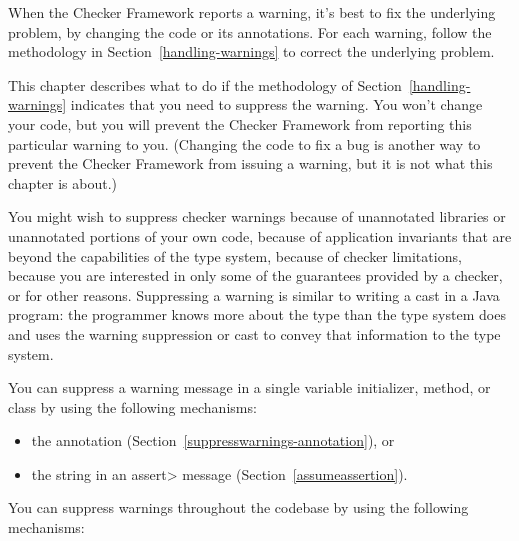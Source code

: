 

When the Checker Framework reports a warning, it's best to fix the
underlying problem, by changing the code or its annotations.  For each
warning, follow the methodology in Section~\ref{handling-warnings} to
correct the underlying problem.

This chapter describes what to do if the methodology of
Section~\ref{handling-warnings} indicates that you need to suppress the
warning.  You won't change your code, but you will prevent the Checker
Framework from reporting this particular warning to you.  (Changing the
code to fix a bug is another way to prevent the Checker Framework from
issuing a warning, but it is not what this chapter is about.)

You might wish to suppress checker warnings because of unannotated libraries
or unannotated portions of your own code, because of application
invariants that are beyond the capabilities of the type system, because of
checker limitations, because you are interested in only some of the
guarantees provided by a checker, or for other reasons.
Suppressing a warning is similar to writing a cast in a Java
program:  the programmer knows more about the type than the type system does
and uses the warning suppression or cast to convey that information to the
type system.

You can suppress a warning message in a single variable initializer,
method, or class by using the following mechanisms:

\begin{itemize}
\item
  the  annotation
  (Section~\ref{suppresswarnings-annotation}), or
\item
  the  string in an \<assert> message (Section~\ref{assumeassertion}).
\end{itemize}

You can suppress warnings throughout the codebase by using the following mechanisms:

